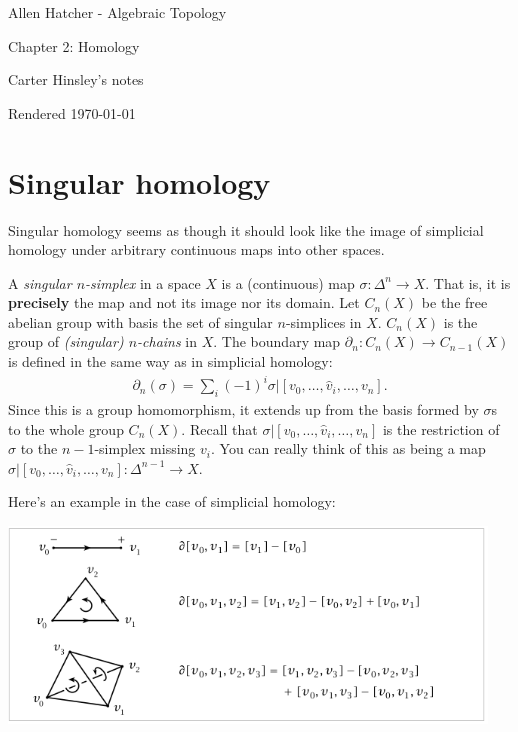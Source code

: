 \documentclass[a4paper]{article}
\begin{document}
\begin{center}
\LARGE{Allen Hatcher - Algebraic Topology}

\Large{Chapter 2: Homology}

\large{Carter Hinsley's notes}

Rendered \today
\end{center}

\section{Singular homology}

Singular homology seems as though it should look like the image of simplicial homology under arbitrary continuous maps into other spaces.

A \emph{singular $n$-simplex} in a space $X$ is a (continuous) map $\sigma : \Delta^n \to X$. That is, it is \textbf{precisely} the map and not its image nor its domain. Let $C_n(X)$ be the free abelian group with basis the set of singular $n$-simplices in $X$. $C_n(X)$ is the group of \emph{(singular) $n$-chains} in $X$. The boundary map $\partial_n : C_n(X) \to C_{n-1}(X)$ is defined in the same way as in simplicial homology:
\begin{align}
    \partial_n(\sigma) = \sum_i (-1)^i \sigma | [v_0, \ldots, \hat{v}_i, \ldots, v_n].
\end{align}
Since this is a group homomorphism, it extends up from the basis formed by $\sigma$s to the whole group $C_n(X)$. Recall that $\sigma|[v_0, \ldots, \hat{v}_i, \ldots, v_n]$ is the restriction of $\sigma$ to the $n-1$-simplex missing $v_i$. You can really think of this as being a map $\sigma|[v_0, \ldots, \hat{v}_i, \ldots, v_n] : \Delta^{n-1} \to X$.

Here's an example in the case of simplicial homology:
\begin{center}
\includegraphics[width=5in]{graphics/simplicial_boundaries.png}
\end{center}
\end{document}
